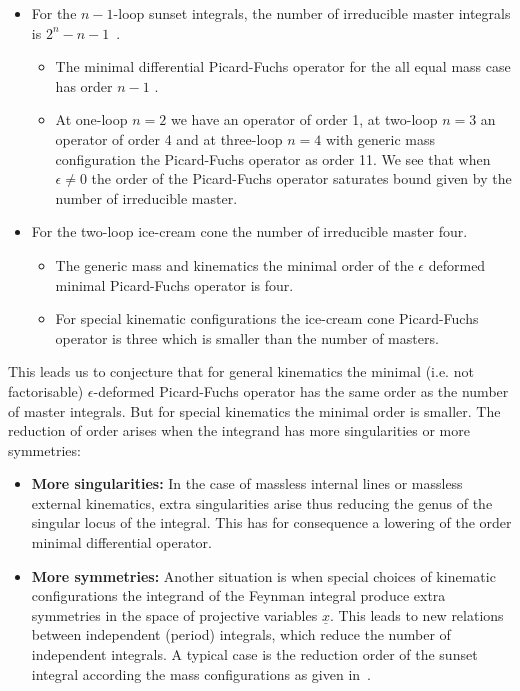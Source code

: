 \documentclass[a4paper,12pt]{article}
\numberwithin{equation}{section}
\numberwithin{figure}{section}
\begin{document}
\begin{itemize}
	\item  For the $n-1$-loop
	sunset integrals, the number of irreducible master integrals 
	is $2^{n}-n-1$~\cite{Kalmykov:2012rr,Bitoun:2017nre}. 
%
%	
	\begin{itemize}  \item The minimal differential Picard-Fuchs operator for the all
		equal mass case has order  $n-1$ .
		\item At one-loop $n=2$ we have an operator of order 1, at two-loop
		$n=3$ an operator of order 4 and at three-loop $n=4$ with generic
		mass configuration the Picard-Fuchs operator
		as   order 11.  We see that when $\epsilon\neq0$  the order of the
		Picard-Fuchs operator saturates bound given by the number of
		irreducible master.
	\end{itemize}
	\item For the two-loop ice-cream cone the number of irreducible
          master four.
          \begin{itemize}
            \item The generic mass and kinematics the minimal order of the $\epsilon$ deformed minimal Picard-Fuchs
	operator is four.
        \item For special kinematic configurations  the ice-cream cone
          Picard-Fuchs operator  is three which is smaller than the
          number of masters.
        \end{itemize}
        \end{itemize}
This leads us to conjecture that 
 for general kinematics the minimal (i.e. not
factorisable) $\epsilon$-deformed Picard-Fuchs operator has 
the same order
as the number of master integrals. But for special kinematics the minimal
order is smaller.
%
The reduction of order arises when the integrand has more
singularities or more symmetries:
\begin{itemize}
  \item {\bf More singularities:} In the case of
massless internal lines or massless external kinematics, extra
singularities arise thus reducing the genus of the
singular locus of the integral. This has for  consequence a lowering
of the order  minimal differential operator. 
\item {\bf More symmetries:}
Another situation is when special choices of kinematic
configurations the integrand of the Feynman integral produce extra
symmetries in the space of projective variables $\underline
x$. This leads to new relations between independent (period) integrals, which reduce the number of independent integrals. A typical case is the
reduction order of the sunset integral according the mass
configurations as given in~\cite{Bloch:2014qca,Lairez:2022zkj,Bonisch:2021yfw,Bonisch:2020qmm,Pogel:2022vat}.
\end{itemize}
\end{document}
